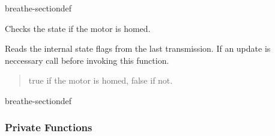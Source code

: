 \documentclass[letterpaper,10pt,english]{sphinxmanual}
\begin{document}
\begin{fulllineitems}
\begin{sphinxuseclass}{breathe-sectiondef}
\begin{fulllineitems}
\label{\detokenize{code/bioscara_hardware_drivers/index:_CPPv4N25bioscara_hardware_drivers25bioscara_hardware_drivers9MockJoint7isHomedEv}}\label{\detokenize{code/bioscara_hardware_drivers/index:_CPPv3N25bioscara_hardware_drivers25bioscara_hardware_drivers9MockJoint7isHomedEv}}\label{\detokenize{code/bioscara_hardware_drivers/index:_CPPv2N25bioscara_hardware_drivers25bioscara_hardware_drivers9MockJoint7isHomedEv}}\label{\detokenize{code/bioscara_hardware_drivers/index:bioscara_hardware_drivers::bioscara_hardware_drivers::MockJoint::isHomed__void}}
\pysigstartsignatures
\pysigstartmultiline
\pysiglinewithargsret
{\label{\detokenize{code/bioscara_hardware_drivers/index:classbioscara__hardware__drivers_1_1MockJoint_1a6892f0942bfe3ca98532258a5b73dc56}}}
{}
{}
\pysigstopmultiline
\pysigstopsignatures
\sphinxAtStartPar
Checks the state if the motor is homed. 

\sphinxAtStartPar
Reads the internal state flags from the last transmission. If an update is neccessary call {\hyperref[\detokenize{code/bioscara_hardware_drivers/index:classbioscara__hardware__drivers_1_1MockJoint_1aceae1bb2d8a377ef28b3b4b94281b652}]{}} before invoking this function.
\begin{quote}\begin{description}
\sphinxAtStartPar
true if the motor is homed, false if not. 

\end{description}\end{quote}

\end{fulllineitems}


\end{sphinxuseclass}
\begin{sphinxuseclass}{breathe-sectiondef}\subsubsection*{Private Functions}


\end{sphinxuseclass}
\end{fulllineitems}
\end{document}
